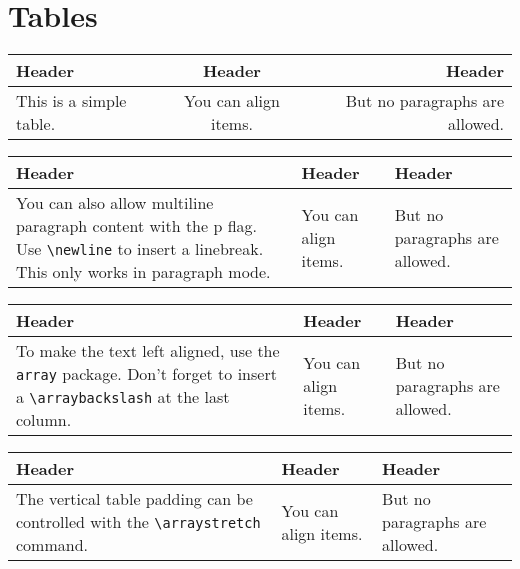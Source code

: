 \documentclass{article}
\begin{document}
\section*{Tables}

\vspace{1cm}

\begin{tabular}{l | c | r}
Header & Header & Header \\
\hline
This is a simple table. & You can align items. & But no paragraphs are allowed.
\end{tabular}

\vspace{1cm}

\noindent
\begin{tabular}{p{} | p{} | p{}}
Header & Header & Header \\
\hline
You can also allow multiline paragraph content with the p flag. \newline \newline Use \texttt{\textbackslash newline} to insert a linebreak. This only works in paragraph mode. & You can align items. & But no paragraphs are allowed.
\end{tabular}

\vspace{1cm}

\noindent
\begin{tabular}{>{\raggedright}p{} | >{\raggedright}p{} | >{\raggedright \arraybackslash}p{}}
Header & Header & Header \\
\hline
To make the text left aligned, use the \texttt{array} package. \newline \newline Don't forget to insert a \texttt{\textbackslash arraybackslash} at the last column. & You can align items. & But no paragraphs are allowed.
\end{tabular}

\vspace{1cm}

\renewcommand*{\arraystretch}{2}

\noindent
\begin{tabular}{>{\raggedright}p{} | >{\raggedright}p{} | >{\raggedright \arraybackslash}p{}}
Header & Header & Header \\
\hline
The vertical table padding can be controlled with the \texttt{\textbackslash arraystretch} command. & You can align items. & But no paragraphs are allowed.
\end{tabular}
\end{document}
